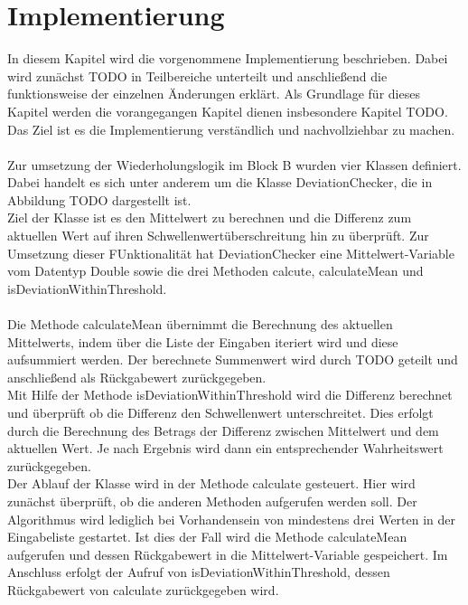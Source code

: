 \documentclass{article}
\begin{document}
    \newpage
    \section{Implementierung}
    In diesem Kapitel wird die vorgenommene Implementierung beschrieben. Dabei wird zunächst TODO in Teilbereiche unterteilt und anschließend die funktionsweise der einzelnen Änderungen erklärt.
    Als Grundlage für dieses Kapitel werden die vorangegangen Kapitel dienen insbesondere Kapitel TODO.
    Das Ziel ist es die Implementierung verständlich und nachvollziehbar zu machen.\\
    \\
    Zur umsetzung der Wiederholungslogik im Block B wurden vier Klassen definiert.
    Dabei handelt es sich unter anderem um die Klasse DeviationChecker, die in Abbildung TODO dargestellt ist.\\
    Ziel der Klasse ist es den Mittelwert zu berechnen und die Differenz zum aktuellen Wert auf ihren Schwellenwertüberschreitung hin zu überprüft.
    Zur Umsetzung dieser FUnktionalität hat DeviationChecker eine Mittelwert-Variable vom Datentyp Double sowie die drei Methoden calcute, calculateMean und isDeviationWithinThreshold.\\
    \\
    Die Methode calculateMean übernimmt die Berechnung des aktuellen Mittelwerts, indem über die Liste der Eingaben iteriert wird und diese aufsummiert werden.
    Der berechnete Summenwert wird durch TODO geteilt und anschließend als Rückgabewert zurückgegeben.\\
    Mit Hilfe der Methode isDeviationWithinThreshold wird die Differenz berechnet und überprüft ob die Differenz den Schwellenwert unterschreitet.
    Dies erfolgt durch die Berechnung des Betrags der Differenz zwischen Mittelwert und dem aktuellen Wert.
    Je nach Ergebnis wird dann ein entsprechender Wahrheitswert zurückgegeben.\\
    Der Ablauf der Klasse wird in der Methode calculate gesteuert. Hier wird zunächst überprüft, ob die anderen Methoden aufgerufen werden soll.
    Der Algorithmus wird lediglich bei Vorhandensein von mindestens drei Werten in der Eingabeliste gestartet.
    Ist dies der Fall wird die Methode calculateMean aufgerufen und dessen Rückgabewert in die Mittelwert-Variable gespeichert.
    Im Anschluss erfolgt der Aufruf von isDeviationWithinThreshold, dessen Rückgabewert von calculate zurückgegeben wird.\\
\end{document}
